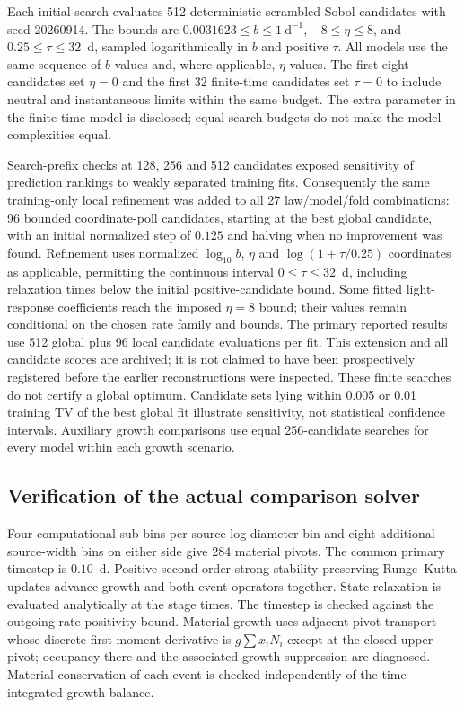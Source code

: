 Each initial search evaluates 512 deterministic scrambled-Sobol candidates with seed 20260914. The bounds are $0.0031623\leq b\leq1~\mathrm{d^{-1}}$, $-8\leq\eta\leq8$, and $0.25\leq\tau\leq32$~d, sampled logarithmically in $b$ and positive $\tau$. All models use the same sequence of $b$ values and, where applicable, $\eta$ values. The first eight candidates set $\eta=0$ and the first 32 finite-time candidates set $\tau=0$ to include neutral and instantaneous limits within the same budget. The extra parameter in the finite-time model is disclosed; equal search budgets do not make the model complexities equal.

Search-prefix checks at 128, 256 and 512 candidates exposed sensitivity of prediction rankings to weakly separated training fits. Consequently the same training-only local refinement was added to all 27 law/model/fold combinations: 96 bounded coordinate-poll candidates, starting at the best global candidate, with an initial normalized step of $0.125$ and halving when no improvement was found. Refinement uses normalized $\log_{10}b$, $\eta$ and $\log(1+\tau/0.25)$ coordinates as applicable, permitting the continuous interval $0\leq\tau\leq32$~d, including relaxation times below the initial positive-candidate bound. Some fitted light-response coefficients reach the imposed $\eta=8$ bound; their values remain conditional on the chosen rate family and bounds. The primary reported results use 512 global plus 96 local candidate evaluations per fit. This extension and all candidate scores are archived; it is not claimed to have been prospectively registered before the earlier reconstructions were inspected. These finite searches do not certify a global optimum. Candidate sets lying within 0.005 or 0.01 training TV of the best global fit illustrate sensitivity, not statistical confidence intervals. Auxiliary growth comparisons use equal 256-candidate searches for every model within each growth scenario.

\subsection{Verification of the actual comparison solver}

Four computational sub-bins per source log-diameter bin and eight additional source-width bins on either side give 284 material pivots. The common primary timestep is $0.10$~d. Positive second-order strong-stability-preserving Runge--Kutta updates advance growth and both event operators together. State relaxation is evaluated analytically at the stage times. The timestep is checked against the outgoing-rate positivity bound. Material growth uses adjacent-pivot transport whose discrete first-moment derivative is $g\sum x_iN_i$ except at the closed upper pivot; occupancy there and the associated growth suppression are diagnosed. Material conservation of each event is checked independently of the time-integrated growth balance.

